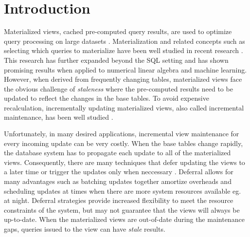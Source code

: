 \section{Introduction}
Materialized views, cached pre-computed query results, are used to optimize query processing on large datasets \cite{gupta1995maintenance, chirkova2011materialized, halevy2001answering}.
Materialization and related concepts such as selecting which queries to materialize
have been well studied in recent research \cite{zaharia2012resilient,lefevre2014opportunistic, bailis2014scalable, perez2014history}.
This research has further expanded beyond the SQL setting \cite{nikolic2014linview} and 
has shown promising results when applied to numerical linear algebra and machine learning.
However, when derived from frequently changing tables,
materialized views face the obvious challenge of \emph{staleness} where the pre-computed results need to be updated to reflect the changes in the base tables.
To avoid expensive recalculation, incrementally updating materialized views,
also called incremental maintenance, has been well studied \cite{gupta1995maintenance, chirkova2011materialized}.

Unfortunately, in many desired applications, incremental view maintenance for every incoming update can be very costly. 
When the base tables change rapidly, the database system has to propagate each update to all of the materialized views.
Consequently, there are many techniques that defer updating the views to a later time or trigger the updates only when neccessary \cite{chirkova2011materialized, zhou2007lazy}.
Deferral allows for many advantages such as batching updates together amortize overheads and scheduling updates at times when there are more system resources available eg. at night.
Deferral strategies provide increased flexibility to meet the resource constraints of the system, but may not guarantee that the views will always be up-to-date.
When the materialized views are out-of-date during the maintenance gaps, queries issued to the view can have \emph{stale} results. 

